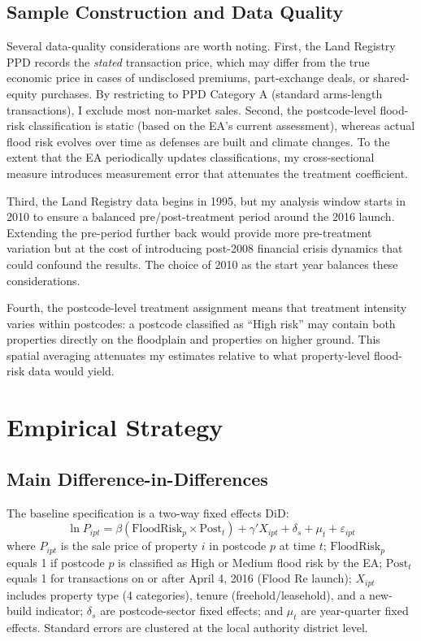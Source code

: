 \documentclass[12pt]{article}
\begin{document}
\subsection{Sample Construction and Data Quality}

Several data-quality considerations are worth noting. First, the Land Registry PPD records the \textit{stated} transaction price, which may differ from the true economic price in cases of undisclosed premiums, part-exchange deals, or shared-equity purchases. By restricting to PPD Category A (standard arms-length transactions), I exclude most non-market sales. Second, the postcode-level flood-risk classification is static (based on the EA's current assessment), whereas actual flood risk evolves over time as defenses are built and climate changes. To the extent that the EA periodically updates classifications, my cross-sectional measure introduces measurement error that attenuates the treatment coefficient.

Third, the Land Registry data begins in 1995, but my analysis window starts in 2010 to ensure a balanced pre/post-treatment period around the 2016 launch. Extending the pre-period further back would provide more pre-treatment variation but at the cost of introducing post-2008 financial crisis dynamics that could confound the results. The choice of 2010 as the start year balances these considerations.

Fourth, the postcode-level treatment assignment means that treatment intensity varies within postcodes: a postcode classified as ``High risk'' may contain both properties directly on the floodplain and properties on higher ground. This spatial averaging attenuates my estimates relative to what property-level flood-risk data would yield.


\section{Empirical Strategy} \label{sec:strategy}

\subsection{Main Difference-in-Differences}

The baseline specification is a two-way fixed effects DiD:
\begin{equation} \label{eq:did}
\ln P_{ipt} = \beta (\text{FloodRisk}_p \times \text{Post}_t) + \gamma' X_{ipt} + \delta_s + \mu_t + \varepsilon_{ipt}
\end{equation}
where $P_{ipt}$ is the sale price of property $i$ in postcode $p$ at time $t$; $\text{FloodRisk}_p$ equals 1 if postcode $p$ is classified as High or Medium flood risk by the EA; $\text{Post}_t$ equals 1 for transactions on or after April 4, 2016 (Flood Re launch); $X_{ipt}$ includes property type (4 categories), tenure (freehold/leasehold), and a new-build indicator; $\delta_s$ are postcode-sector fixed effects; and $\mu_t$ are year-quarter fixed effects. Standard errors are clustered at the local authority district level.
\end{document}
